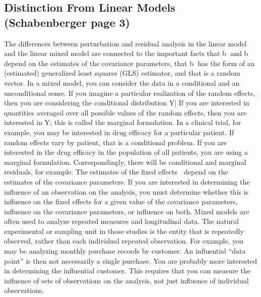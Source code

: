 \documentclass[12pt, a4paper]{report}
\theoremstyle{plain}
\theoremstyle{definition}
\theoremstyle{remark}
\begin{document}
	\subsection{Distinction From Linear Models (Schabenberger page 3)}
	The differences between perturbation and residual analysis in the linear model and the linear mixed model
	are connected to the important facts that b and b
	depend on the estimates of the covariance parameters,
	that b has the form of an (estimated) generalized least squares (GLS) estimator, and that 
	is a random
	vector.
	In a mixed model, you can consider the data in a conditional and an unconditional sense. If you imagine
	a particular realization of the random effects, then you are considering the conditional distribution
	Y|
	If you are interested in quantities averaged over all possible values of the random effects, then
	you are interested in Y; this is called the marginal formulation. In a clinical trial, for example, you
	may be interested in drug efficacy for a particular patient. If random effects vary by patient, that is a
	conditional problem. If you are interested in the drug efficacy in the population of all patients, you are
	using a marginal formulation. Correspondingly, there will be conditional and marginal residuals, for
	example.
	The estimates of the fixed effects  depend on the estimates of the covariance parameters. If you are
	interested in determining the influence of an observation on the analysis, you must determine whether
	this is influence on the fixed effects for a given value of the covariance parameters, influence on the
	covariance parameters, or influence on both.
	Mixed models are often used to analyze repeated measures and longitudinal data. The natural experimental
	or sampling unit in those studies is the entity that is repeatedly observed, rather than each
	individual repeated observation. For example, you may be analyzing monthly purchase records by
	customer. 
	An influential “data point” is then not necessarily a single purchase. You are probably more
	interested in determining the influential customer. This requires that you can measure the influence
	of sets of observations on the analysis, not just influence of individual observations.
\end{document}
